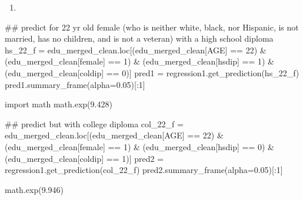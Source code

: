 \documentclass[
  letterpaper,
  DIV=11,
  numbers=noendperiod]{scrartcl}
\newenvironment{Shaded}{\begin{snugshade}}{\end{snugshade}}
\newcommand{\CommentTok}[1]{\textcolor[rgb]{0.37,0.37,0.37}{#1}}
\newcommand{\DecValTok}[1]{\textcolor[rgb]{0.68,0.00,0.00}{#1}}
\newcommand{\FloatTok}[1]{\textcolor[rgb]{0.68,0.00,0.00}{#1}}
\newcommand{\ImportTok}[1]{\textcolor[rgb]{0.00,0.46,0.62}{#1}}
\newcommand{\NormalTok}[1]{\textcolor[rgb]{0.00,0.23,0.31}{#1}}
\newcommand{\OperatorTok}[1]{\textcolor[rgb]{0.37,0.37,0.37}{#1}}
\newcommand{\StringTok}[1]{\textcolor[rgb]{0.13,0.47,0.30}{#1}}
\providecommand{\tightlist}{%
  \setlength{\itemsep}{0pt}\setlength{\parskip}{0pt}}\usepackage{longtable,booktabs,array}
\begin{document}
\begin{enumerate}
\def\labelenumi{\alph{enumi}.}
\setcounter{enumi}{2}
\tightlist
\item
\end{enumerate}

\begin{Shaded}
\begin{Highlighting}[]
\CommentTok{\#\# predict for 22 yr old female (who is neither white, black, nor Hispanic, is not married, has no children, and is not a veteran) with a high school diploma}
\NormalTok{hs\_22\_f }\OperatorTok{=}\NormalTok{ edu\_merged\_clean.loc[(edu\_merged\_clean[}\StringTok{\textquotesingle{}AGE\textquotesingle{}}\NormalTok{] }\OperatorTok{==} \DecValTok{22}\NormalTok{) }\OperatorTok{\&}\NormalTok{ (edu\_merged\_clean[}\StringTok{\textquotesingle{}female\textquotesingle{}}\NormalTok{] }\OperatorTok{==} \DecValTok{1}\NormalTok{) }\OperatorTok{\&}\NormalTok{ (edu\_merged\_clean[}\StringTok{\textquotesingle{}hsdip\textquotesingle{}}\NormalTok{] }\OperatorTok{==} \DecValTok{1}\NormalTok{) }\OperatorTok{\&}\NormalTok{ (edu\_merged\_clean[}\StringTok{\textquotesingle{}coldip\textquotesingle{}}\NormalTok{] }\OperatorTok{==} \DecValTok{0}\NormalTok{)]}
\NormalTok{pred1 }\OperatorTok{=}\NormalTok{ regression1.get\_prediction(hs\_22\_f)}
\NormalTok{pred1.summary\_frame(alpha}\OperatorTok{=}\FloatTok{0.05}\NormalTok{)[:}\DecValTok{1}\NormalTok{]}

\ImportTok{import}\NormalTok{ math }
\NormalTok{math.exp(}\FloatTok{9.428}\NormalTok{)}

\CommentTok{\#\# predict but with college diploma}
\NormalTok{col\_22\_f }\OperatorTok{=}\NormalTok{ edu\_merged\_clean.loc[(edu\_merged\_clean[}\StringTok{\textquotesingle{}AGE\textquotesingle{}}\NormalTok{] }\OperatorTok{==} \DecValTok{22}\NormalTok{) }\OperatorTok{\&}\NormalTok{ (edu\_merged\_clean[}\StringTok{\textquotesingle{}female\textquotesingle{}}\NormalTok{] }\OperatorTok{==} \DecValTok{1}\NormalTok{) }\OperatorTok{\&}\NormalTok{ (edu\_merged\_clean[}\StringTok{\textquotesingle{}hsdip\textquotesingle{}}\NormalTok{] }\OperatorTok{==} \DecValTok{0}\NormalTok{) }\OperatorTok{\&}\NormalTok{ (edu\_merged\_clean[}\StringTok{\textquotesingle{}coldip\textquotesingle{}}\NormalTok{] }\OperatorTok{==} \DecValTok{1}\NormalTok{)]}
\NormalTok{pred2 }\OperatorTok{=}\NormalTok{ regression1.get\_prediction(col\_22\_f)}
\NormalTok{pred2.summary\_frame(alpha}\OperatorTok{=}\FloatTok{0.05}\NormalTok{)[:}\DecValTok{1}\NormalTok{]}

\NormalTok{math.exp(}\FloatTok{9.946}\NormalTok{)}
\end{Highlighting}
\end{Shaded}
\end{document}

